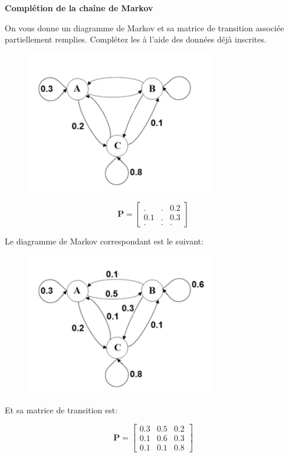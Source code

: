 \begin{Exercice}[10 minutes]\textbf{Complétion de la chaîne de Markov}

On vous donne un diagramme de Markov et sa matrice de transition associée partiellement remplies. Complétez les à l'aide des données déjà inscrites.

\begin{figure}[h!]
	   \centering
	   \includegraphics[width=.7\textwidth]{Markov_incomplete.png}
\end{figure}

	\[ 
		\mathbf{P} =
		\begin{bmatrix}
		. & . & 0.2 \\
		0.1 & . & 0.3 \\
		. & . & .
		\end{bmatrix}
	\]

\begin{solution}
        Le diagramme de Markov correspondant est le suivant:

	\begin{figure}[h!]
	    \centering
	    \includegraphics[width=.7\textwidth]{Markov_complete.png}

	\end{figure}
	
	Et sa matrice de transition est:

	\[ 
		\mathbf{P} =
		\begin{bmatrix}
		0.3 & 0.5 & 0.2 \\
		0.1 & 0.6 & 0.3 \\
		0.1 & 0.1 & 0.8
		\end{bmatrix}
	\]
	
    \end{solution}
\end{Exercice}

